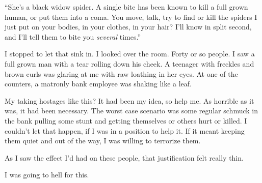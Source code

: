 ``She's a black widow spider.  A single bite has been known to kill a full grown human, or put them into a coma.  You move, talk, try to find or kill the spiders I just put on your bodies, in your clothes, in your hair?  I'll know in split second, and I'll tell them to bite you \emph{several} times.''



I stopped to let that sink in.  I looked over the room.  Forty or so people.  I saw a full grown man with a tear rolling down his cheek.  A teenager with freckles and brown curls was glaring at me with raw loathing in her eyes.  At one of the counters, a matronly bank employee was shaking like a leaf.



My taking hostages like this?  It had been my idea, so help me.  As horrible as it was, it had been necessary.  The worst case scenario was some regular schmuck in the bank pulling some stunt and getting themselves or others hurt or killed.  I couldn't let that happen, if I was in a position to help it.  If it meant keeping them quiet and out of the way, I was willing to terrorize them.



As I saw the effect I'd had on these people, that justification felt really thin.



I was going to hell for this.

















